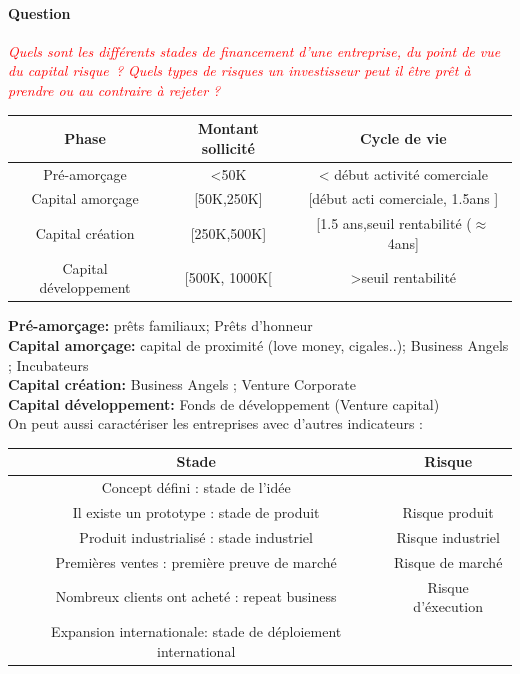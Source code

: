 \documentclass[12pt,oneside,a4paper]{article}
\newcommand{\question}[1]
{
\addtocounter{section}{1}
\paragraph*{Question \thesection}
\emph{\textcolor{red}{#1}}
}
\begin{document}
\question{Quels sont les différents stades de financement d’une entreprise, du point de vue du capital risque ? Quels types de risques un investisseur peut il être prêt à prendre ou au contraire à rejeter ?}

\vspace{1cm}
\begin{tabular}{|c|c|c|} 
	\hline
	 Phase & Montant sollicité & Cycle de vie\\
	 \hline
	 Pré-amorçage & <50K & < début activité comerciale\\
	 \hline
	 Capital amorçage & [50K,250K] & [début acti comerciale, 1.5ans ]\\
	 \hline
	 Capital création & [250K,500K] & [1.5 ans,seuil rentabilité ($\approx$4ans]\\
	 \hline
	 Capital développement & [500K, 1000K[ & >seuil rentabilité\\
	 \hline
\end{tabular} 
\vspace{1cm}

\noindent
\textbf{Pré-amorçage:} prêts familiaux; Prêts d'honneur \\
\textbf{Capital amorçage:} capital de proximité (love money, cigales..); Business Angels ; Incubateurs\\
\textbf{Capital création: }Business Angels ; Venture Corporate\\
\textbf{Capital développement:} Fonds de développement (Venture capital)\\

On peut aussi caractériser les entreprises avec d'autres indicateurs : 

\vspace{1cm}
\begin{center}
\begin{tabular}{|c|c|}
	\hline
	Stade & Risque\\
	\hline
	Concept défini : stade de l'idée & \\
	\hline
	Il existe un prototype : stade de produit & Risque produit\\
	\hline
	Produit industrialisé : stade industriel & Risque industriel\\
	\hline
	Premières ventes : première preuve de marché & Risque de marché\\
	\hline
	Nombreux clients ont acheté : repeat business & Risque d'éxecution\\
	\hline
	Expansion internationale: stade de déploiement international & \\
	\hline

\end{tabular}
\end{center}
\vspace{1cm}
\end{document}
